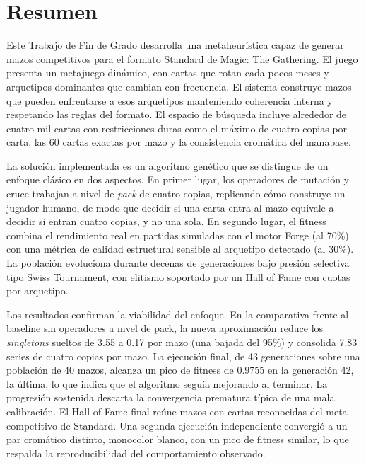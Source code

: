 
\chapter*{Resumen}

Este Trabajo de Fin de Grado desarrolla una metaheurística capaz de generar mazos competitivos para el formato Standard de Magic: The Gathering. El juego presenta un metajuego dinámico, con cartas que rotan cada pocos meses y arquetipos dominantes que cambian con frecuencia. El sistema construye mazos que pueden enfrentarse a esos arquetipos manteniendo coherencia interna y respetando las reglas del formato. El espacio de búsqueda incluye alrededor de cuatro mil cartas con restricciones duras como el máximo de cuatro copias por carta, las 60 cartas exactas por mazo y la consistencia cromática del manabase.

La solución implementada es un algoritmo genético que se distingue de un enfoque clásico en dos aspectos. En primer lugar, los operadores de mutación y cruce trabajan a nivel de \emph{pack} de cuatro copias, replicando cómo construye un jugador humano, de modo que decidir si una carta entra al mazo equivale a decidir si entran cuatro copias, y no una sola. En segundo lugar, el fitness combina el rendimiento real en partidas simuladas con el motor Forge (al 70\%) con una métrica de calidad estructural sensible al arquetipo detectado (al 30\%). La población evoluciona durante decenas de generaciones bajo presión selectiva tipo Swiss Tournament, con elitismo soportado por un Hall of Fame con cuotas por arquetipo.

Los resultados confirman la viabilidad del enfoque. En la comparativa frente al baseline sin operadores a nivel de pack, la nueva aproximación reduce los \emph{singletons} sueltos de 3.55 a 0.17 por mazo (una bajada del 95\%) y consolida 7.83 series de cuatro copias por mazo. La ejecución final, de 43 generaciones sobre una población de 40 mazos, alcanza un pico de fitness de 0.9755 en la generación 42, la última, lo que indica que el algoritmo seguía mejorando al terminar. La progresión sostenida descarta la convergencia prematura típica de una mala calibración. El Hall of Fame final reúne mazos con cartas reconocidas del meta competitivo de Standard. Una segunda ejecución independiente convergió a un par cromático distinto, monocolor blanco, con un pico de fitness similar, lo que respalda la reproducibilidad del comportamiento observado.

